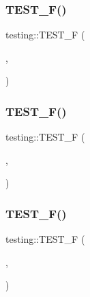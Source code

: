 \subsubsection{\texorpdfstring{TEST\_F()}{TEST\_F()}\hspace{0.1cm}{\footnotesize\ttfamily [5/52]}}
{\footnotesize\ttfamily testing\+::\+T\+E\+S\+T\+\_\+F (\begin{DoxyParamCaption}\item[{\mbox{\hyperlink{classtesting_1_1_set_up_test_case_test}{Set\+Up\+Test\+Case\+Test}}}]{,  }\item[{Test2}]{ }\end{DoxyParamCaption})}

\mbox{\label{namespacetesting_a071d841c6f97de4f9fd502ed3c24c017}} 
\subsubsection{\texorpdfstring{TEST\_F()}{TEST\_F()}\hspace{0.1cm}{\footnotesize\ttfamily [6/52]}}
{\footnotesize\ttfamily testing\+::\+T\+E\+S\+T\+\_\+F (\begin{DoxyParamCaption}\item[{\mbox{\hyperlink{classtesting_1_1_set_up_test_suite_test}{Set\+Up\+Test\+Suite\+Test}}}]{,  }\item[{Test\+Setup\+Test\+Suite1}]{ }\end{DoxyParamCaption})}

\mbox{\label{namespacetesting_a505d03ad8946d9a4598f8a6754bd2172}} 
\subsubsection{\texorpdfstring{TEST\_F()}{TEST\_F()}\hspace{0.1cm}{\footnotesize\ttfamily [7/52]}}
{\footnotesize\ttfamily testing\+::\+T\+E\+S\+T\+\_\+F (\begin{DoxyParamCaption}\item[{\mbox{\hyperlink{classtesting_1_1_set_up_test_suite_test}{Set\+Up\+Test\+Suite\+Test}}}]{,  }\item[{Test\+Setup\+Test\+Suite2}]{ }\end{DoxyParamCaption})}

